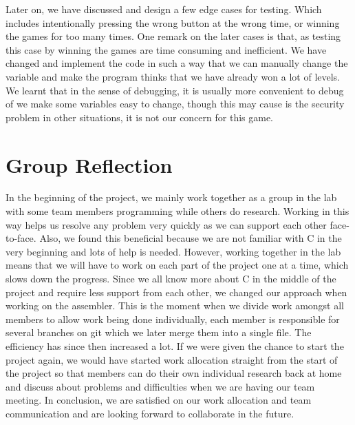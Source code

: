 \documentclass[11pt]{article}
\begin{document}
Later on, we have discussed and design a few edge cases for testing. Which includes intentionally pressing the wrong button at the wrong time, or winning the games for too many times. One remark on the later cases is that, as testing this case by winning the games are time consuming and inefficient. We have changed and implement the code in such a way that we can manually change the variable and make the program thinks that we have already won a lot of levels. We learnt that in the sense of debugging, it is usually more convenient to debug of we make some variables easy to change, though this may cause is the security problem in other situations, it is not our concern for this game.


\section{Group Reflection}
In the beginning of the project, we mainly work together as a group in the lab with some team members programming while others do research. Working in this way helps us resolve any problem very quickly as we can support each other face-to-face. Also, we found this beneficial because we are not familiar with C in the very beginning and lots of help is needed. However, working together in the lab means that we will have to work on each part of the project one at a time, which slows down the progress. Since we all know more about C in the middle of the project and require less support from each other, we changed our approach when working on the assembler. This is the moment when we divide work amongst all members to allow work being done individually, each member is responsible for several branches on git which we later merge them into a single file. The efficiency has since then increased a lot. If we were given the chance to start the project again, we would have started work allocation straight from the start of the project so that members can do their own individual research back at home and discuss about problems and difficulties when we are having our team meeting. In conclusion, we are satisfied on our work allocation and team communication and are looking forward to collaborate in the future.
\end{document}
